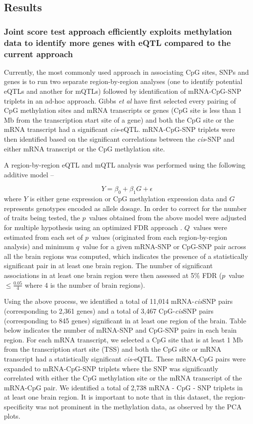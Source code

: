 \documentclass[hidelinks]{article}
\begin{document}
\subsection{Results}

\subsubsection{Joint score test approach efficiently exploits methylation data to identify more genes with eQTL compared to the current approach}

Currently, the most commonly used approach in associating CpG sites, SNPs and genes is to run two separate region-by-region analyses (one to identify potential eQTLs and another for mQTLs) followed by identification of mRNA-CpG-SNP triplets in an ad-hoc approach. Gibbs \emph{et al} have first selected every pairing of CpG methylation sites and mRNA transcripts or genes (CpG site is less than 1 Mb from the transcription start site of a gene) and both the CpG site or the mRNA transcript had a significant \emph{cis}-eQTL. mRNA-CpG-SNP triplets were then identified based on the significant correlations between the \emph{cis}-SNP and either mRNA transcript or the CpG methylation site.

A region-by-region eQTL and mQTL analysis was performed using the following additive model --
	
\begin{equation*}
Y = \beta_0 + \beta_1 G + \epsilon
\end{equation*}
where $Y$ is either gene expression or CpG methylation expression data and $G$ represents genotypes encoded as allele dosage. In order to correct for the number of traits being tested, the $p$~values obtained from the above model were adjusted for multiple hypothesis using an optimized FDR approach \cite{qvalue}. $Q$~values were estimated from each set of $p$~values (originated from each region-by-region analysis) and minimum $q$~value for a given mRNA-SNP or CpG-SNP pair across all the brain regions was computed, which indicates the presence of a statistically significant pair in at least one brain region. The number of significant associations in at least one brain region were then assessed at 5\% FDR ($p$~value $\leq \frac{0.05}{4}$ where 4 is the number of brain regions). 

Using the above process, we identified a total of 11,014 mRNA-\emph{cis}SNP pairs (corresponding to 2,361 genes) and a total of 3,467 CpG-\emph{cis}SNP pairs (corresponding to 845 genes) significant in at least one region of the brain. Table below indicates the number of mRNA-SNP and CpG-SNP pairs in each brain region. For each mRNA transcript, we selected a CpG site that is at least 1 Mb from the transcription start site (TSS) and both the CpG site or mRNA transcript had a statistically significant \emph{cis-}eQTL. These mRNA-CpG pairs were expanded to mRNA-CpG-SNP triplets where the SNP was significantly correlated with either the CpG methylation site or the mRNA transcript of the mRNA-CpG pair. We identified a total of 2,738 mRNA - CpG - SNP triplets in at least one brain region. It is important to note that in this dataset, the region-specificity was not prominent in the methylation data, as observed by the PCA plots.
\end{document}
